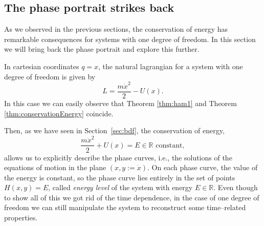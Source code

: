 \documentclass[english,fontsize=11pt,paper=b5]{scrbook}
\numberwithin{equation}{chapter}
\theoremstyle{definition}
\newcommand{\emphidx}[1]{\index{#1}\emph{#1}}
\begin{document}


    \subsection{The phase portrait strikes back}\label{sec:1deg-again}

    As we observed in the previous sections, the conservation of energy has remarkable consequences for systems with one degree of freedom.
    In this section we will bring back the phase portrait and explore this further.

    In cartesian coordinates $q = x$, the natural lagrangian for a system with one degree of freedom is given by
    \begin{equation}
    L = \frac{m \dot x^2}{2} - U(x).
    \end{equation}
    In this case we can easily observe that Theorem \ref{thm:ham1} and Theorem \ref{thm:conservationEnergy} coincide.

    Then, as we have seen in Section~\ref{sec:bdf}, the conservation of energy,
    \begin{equation}\label{eq:cenergy1}
      \frac{m \dot x^2}{2} + U(x) = E \in\mathbb{R} \mbox{ constant},
    \end{equation}
    allows us to explicitly describe the phase curves, i.e., the solutions of the equations of motion in the plane $(x, y := \dot x)$.
    On each phase curve, the value of the energy is constant, so the phase curve lies entirely in the set of points $H(x,y)=E$, called \emphidx{energy level} of the system with energy $E\in\mathbb{R}$. Even though to show all of this we got rid of the time dependence, in the case of one degree of freedom we can still manipulate the system to reconstruct some time--related properties.
\end{document}
